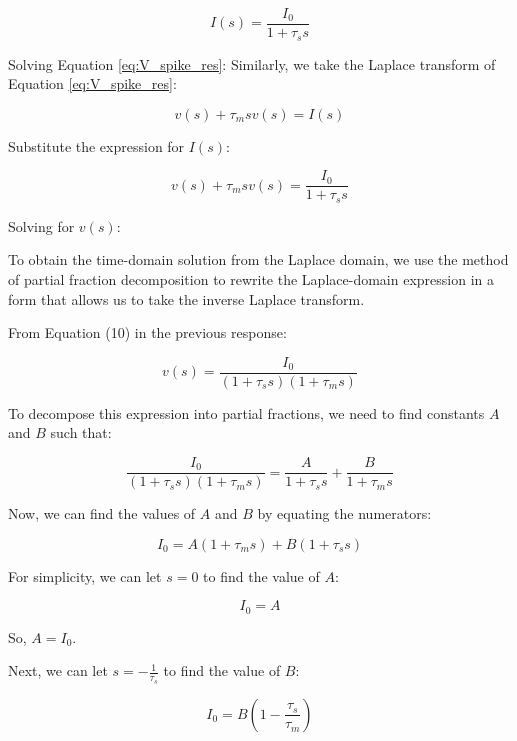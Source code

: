 \documentclass{article}
\begin{document}
\begin{equation}
    I(s) = \frac{I_0}{1 + \tau_s s}
\end{equation}

Solving Equation \ref{eq:V_spike_res}:
Similarly, we take the Laplace transform of Equation \ref{eq:V_spike_res}:

\begin{equation}
    v(s) + \tau_m s v(s) = I(s)
\end{equation}

Substitute the expression for $I(s)$:

\begin{equation}
    v(s) + \tau_m s v(s) = \frac{I_0}{1 + \tau_s s}
\end{equation}

Solving for $v(s)$:

To obtain the time-domain solution from the Laplace domain, we use the method of partial fraction decomposition to rewrite the Laplace-domain expression in a form that allows us to take the inverse Laplace transform.

From Equation (10) in the previous response:

\begin{equation}
    v(s) = \frac{I_0}{(1 + \tau_s s)(1 + \tau_m s)}
\end{equation}

To decompose this expression into partial fractions, we need to find constants $A$ and $B$ such that:

\begin{equation}
    \frac{I_0}{(1 + \tau_s s)(1 + \tau_m s)} = \frac{A}{1 + \tau_s s} + \frac{B}{1 + \tau_m s}
\end{equation}

Now, we can find the values of $A$ and $B$ by equating the numerators:

\begin{equation}
    I_0 = A(1 + \tau_m s) + B(1 + \tau_s s)
\end{equation}

For simplicity, we can let $s = 0$ to find the value of $A$:

\begin{equation}
    I_0 = A
\end{equation}

So, $A = I_0$.

Next, we can let $s = -\frac{1}{\tau_s}$ to find the value of $B$:

\begin{equation}
    I_0 = B\left(1 - \frac{\tau_s}{\tau_m}\right)
\end{equation}
\end{document}
